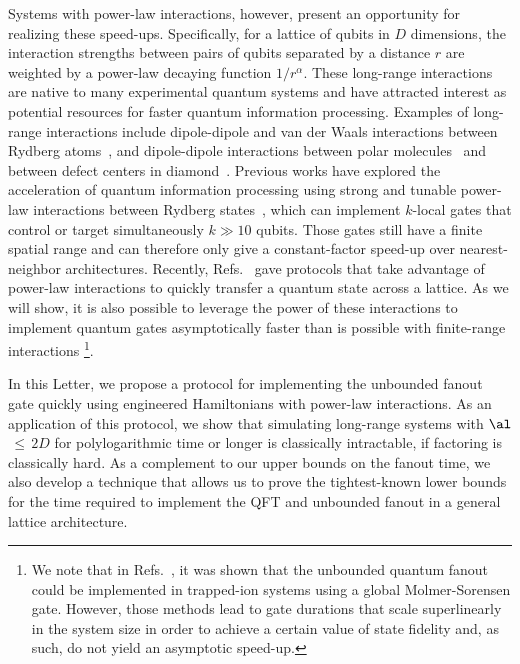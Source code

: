 Systems with power-law interactions, however, present an opportunity for realizing these speed-ups.
Specifically, for a lattice of qubits in $D$ dimensions, the interaction strengths between pairs of qubits separated by a distance $r$ are weighted by a power-law decaying function $1/r^\alpha$.
These long-range interactions are native to many experimental quantum systems and have attracted interest as potential resources for faster quantum information processing. Examples of long-range interactions include dipole-dipole and van der Waals interactions between Rydberg atoms~\cite{Saffman2010,Weimer2012}, and dipole-dipole interactions between polar molecules~\cite{Yan2013} and between defect centers in diamond~\cite{Yao2012,Weimer2012}.
Previous works have explored the acceleration of quantum information processing using strong and tunable power-law interactions between Rydberg states~\cite{Isenhower2011,Molmer2011,Petrosyan2017,Gulliksen2015,Muller2009,Young2020,Levine2019}, which can implement $k$-local gates that control or target simultaneously $k \gg 10$ qubits.
Those gates still have a finite spatial range and can therefore only give a constant-factor speed-up over nearest-neighbor architectures.
Recently, Refs.~\cite{Eldredge2017,Guo2020,Tran2020hierarchylinearlightcones,kuwaharaStrictlyLinearLight2020} gave protocols that take advantage of power-law interactions to quickly transfer a quantum state across a lattice.
As we will show, it is also possible to leverage the power of these interactions to implement quantum gates asymptotically faster than is possible with finite-range interactions \footnote{We note that in Refs.~\cite{Maslov2018,Lu2019}, it was shown that the unbounded quantum fanout could be implemented in trapped-ion systems using a global Molmer-Sorensen gate.
    However, those methods lead to gate durations that scale superlinearly in the system size in order to achieve a certain value of state fidelity and, as such, do not yield an asymptotic speed-up.}.

In this Letter, we propose a protocol for implementing the unbounded fanout gate quickly using engineered Hamiltonians with power-law interactions.
As an application of this protocol, we show that simulating long-range systems with $\al$\,$\le$\,$2D$ for polylogarithmic time or longer is classically intractable, if factoring is classically hard.
As a complement to our upper bounds on the fanout time, we also develop a technique that allows us to prove the tightest-known lower bounds for the time required to implement the QFT and unbounded fanout in a general lattice architecture.

